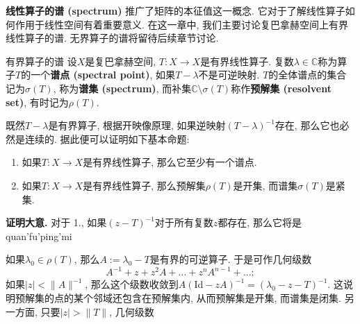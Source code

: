 \textbf{线性算子的谱 (spectrum)} 推广了矩阵的本征值这一概念. 它对于了解线性算子如何作用于线性空间有着重要意义. 在这一章中, 我们主要讨论复巴拿赫空间上有界线性算子的谱. 无界算子的谱将留待后续章节讨论.

\begin{definition}{有界算子的谱}
设$X$是复巴拿赫空间, $T:X\to X$是有界线性算子. 复数$\lambda\in\mathbb{C}$称为算子$T$的一个\textbf{谱点 (spectral point)}, 如果$T-\lambda$不是可逆映射. $T$的全体谱点的集合记为$\sigma(T)$, 称为\textbf{谱集 (spectrum)}, 而补集$\mathbb{C}\setminus\sigma(T)$称作\textbf{预解集 (resolvent set)}, 有时记为$\rho(T)$.
\end{definition}

既然$T-\lambda$是有界算子, 根据开映像原理, 如果逆映射$(T-\lambda)^{-1}$存在, 那么它也必然是连续的. 据此便可以证明如下基本命题:

\begin{theorem}{}
\begin{enumerate}
\item 如果$T:X\to X$是有界线性算子, 那么它至少有一个谱点.
\item 如果$T:X\to X$是有界线性算子, 那么预解集$\rho(T)$是开集, 而谱集$\sigma(T)$是紧集.
\end{enumerate}
\end{theorem}
\textbf{证明大意.} 
对于 1., 如果$(z-T)^{-1}$对于所有复数$z$都存在, 那么它将是quan'fu'ping'mi

如果$\lambda_0\in\rho(T)$, 那么$A:=\lambda_0-T$是有界的可逆算子. 于是可作几何级数
$$
A^{-1}+z+z^2A+...+z^nA^{n-1}+...;
$$
如果$|z|<\|A\|^{-1}$, 那么这个级数收敛到$A(\text{Id}-zA)^{-1}=(\lambda_0-z-T)^{-1}$. 这说明预解集的点的某个邻域还包含在预解集内, 从而预解集是开集, 而谱集是闭集. 另一方面, 只要$|z|>\|T\|$, 几何级数
